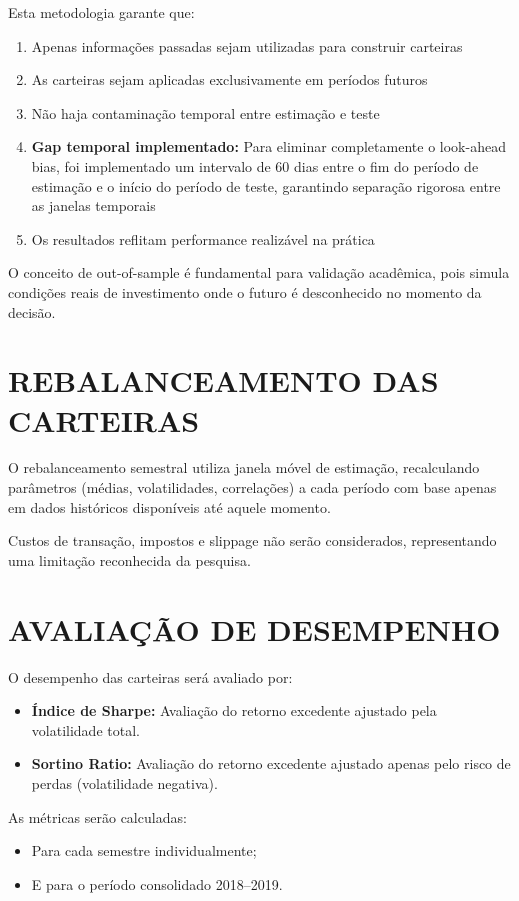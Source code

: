 Esta metodologia garante que:
\begin{enumerate}
    \item Apenas informações passadas sejam utilizadas para construir carteiras
    \item As carteiras sejam aplicadas exclusivamente em períodos futuros
    \item Não haja contaminação temporal entre estimação e teste
    \item \textbf{Gap temporal implementado:} Para eliminar completamente o look-ahead bias, foi implementado um intervalo de 60 dias entre o fim do período de estimação e o início do período de teste, garantindo separação rigorosa entre as janelas temporais
    \item Os resultados reflitam performance realizável na prática
\end{enumerate}

O conceito de out-of-sample é fundamental para validação acadêmica, pois simula condições reais de investimento onde o futuro é desconhecido no momento da decisão.

\section{REBALANCEAMENTO DAS CARTEIRAS}

O rebalanceamento semestral utiliza janela móvel de estimação, recalculando parâmetros (médias, volatilidades, correlações) a cada período com base apenas em dados históricos disponíveis até aquele momento.

Custos de transação, impostos e slippage não serão considerados, representando uma limitação reconhecida da pesquisa.

\section{AVALIAÇÃO DE DESEMPENHO}

O desempenho das carteiras será avaliado por:

\begin{itemize}
    \item \textbf{Índice de Sharpe:} Avaliação do retorno excedente ajustado pela volatilidade total.
    \item \textbf{Sortino Ratio:} Avaliação do retorno excedente ajustado apenas pelo risco de perdas (volatilidade negativa).
\end{itemize}

As métricas serão calculadas:
\begin{itemize}
    \item Para cada semestre individualmente;
    \item E para o período consolidado 2018--2019.
\end{itemize}

